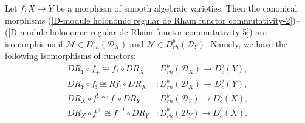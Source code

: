 \begin{theorem}\label{D-module holonomic regular de Rham functor isomorphism}
Let $f:X\to Y$ be a morphism of smooth algebraic varieties. Then the canonical morphisms (\ref{D-module holonomic regular de Rham functor commutativity-2})--(\ref{D-module holonomic regular de Rham functor commutativity-5}) are isomorphisms if $\mathscr{M}\in D^b_{rh}(\mathscr{D}_X)$ and $\mathscr{N}\in D^b_{rh}(\mathscr{D}_Y)$. Namely, we have the following isomorphisms of functors:
\begin{align*}
DR_Y\circ f_+\cong f_*\circ DR_X&:D^b_{rh}(\mathscr{D}_X)\to D^b_c(Y),\\
DR_Y\circ f_!\cong Rf_!\circ DR_X&:D^b_{rh}(\mathscr{D}_X)\to D^b_c(Y),\\
DR_X\circ f^!\cong f^!\circ DR_Y&:D^b_{rh}(\mathscr{D}_Y)\to D^b_c(X),\\
DR_X\circ f^+\cong f^{-1}\circ DR_Y&:D^b_{rh}(\mathscr{D}_Y)\to D^b_c(X).
\end{align*}
\end{theorem}
